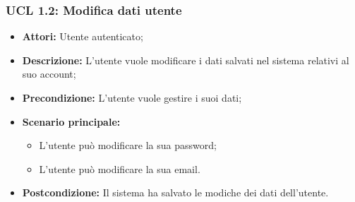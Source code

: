 \subsubsection{UCL 1.2: Modifica dati utente} %
\begin{itemize}
	\item \textbf{Attori:} Utente autenticato;
	\item \textbf{Descrizione:} L'utente vuole modificare i dati salvati nel sistema relativi al suo account;
	\item \textbf{Precondizione:} L'utente vuole gestire i suoi dati;
	\item \textbf{Scenario principale:}
	\begin{itemize}
		\item L'utente può modificare la sua password;
		\item L'utente può modificare la sua email.
	\end{itemize}
\item \textbf{Postcondizione:} Il sistema ha salvato le modiche dei dati dell'utente.
\end{itemize}

\hypertarget{L1.2.1}{}
